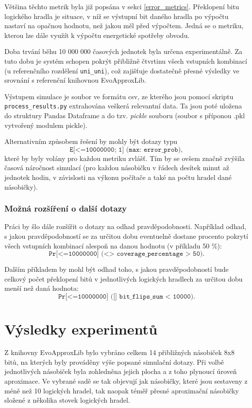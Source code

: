 Většina těchto metrik byla již popsána v sekci \ref{error_metrics}. Překlopení bitu logického hradla je situace, v níž se výstupní bit daného hradla po výpočtu nastaví na opačnou hodnotu, než jakou měl před výpočtem. Jedná se o metriku, kterou lze dále využít k výpočtu energetické spotřeby obvodu.

Doba trvání běhu 10 000 000 časových jednotek byla určena experimentálně. Za tuto dobu je systém schopen pokrýt přibližně čtvrtinu všech vstupních kombinací (u referenčního rozdělení \texttt{uni\_uni}), což zajišťuje dostatečně přesné výsledky ve srovnání s referenční knihovnou EvoApproxLib.

Výstupem simulace je soubor ve formátu csv, ze kterého jsou pomocí skriptu \\\texttt{process\_results.py} extrahována veškerá relevantní data. Ta jsou poté uložena do struktury Pandas Dataframe a do tzv. \textit{pickle} souboru (soubor s příponou .pkl vytvořený modulem pickle).

Alternativním způsobem řešení by mohly být dotazy typu
\begin{equation*}
    \texttt{E[<=10000000; 1] (max: error\_prob)},
\end{equation*}
které by byly volány pro každou metriku zvlášť. Tím by se ovšem značně zvýšila časová náročnost simulací (pro každou násobičku v řádech desítek minut až jednotek hodin, v závislosti na výkonu počítače a také na počtu hradel dané násobičky).

\subsection{Možná rozšíření o další dotazy}
Práci by šlo dále rozšířit o dotazy na odhad pravděpodobnosti. Například odhad, s jakou pravděpodobností se za určitou dobu eventuelně dostane procento pokrytí všech vstupních kombinací alespoň na danou hodnotu (v příkladu 50 \%):
\begin{equation*}
    \texttt{Pr[<=10000000] (<> coverage\_percentage > 50)}.
\end{equation*}

Dalším příkladem by mohl být odhad toho, s jakou pravděpodobností bude celkový počet překlopení bitů v jednotlivých logických hradlech za určitou dobu menší než daná hodnota:
\begin{equation*}
    \texttt{Pr[<=10000000] ([] bit\_flips\_sum < 10000)}.
\end{equation*}

\chapter{Výsledky experimentů}
\label{experimenty}
Z knihovny EvoApproxLib bylo vybráno celkem 14 přibližných násobiček 8x8 bitů, na kterých byly prováděny výše popsané simulační dotazy. Při volbě jednotlivých násobiček byla zohledněna jejich plocha a z toho plynoucí úroveň aproximace. Ve vybrané sadě se tak objevují jak násobičky, které jsou sestaveny z méně než 10 logických hradel, tak naopak téměř přesné aproximační násobičky složené z několika stovek logických hradel.

